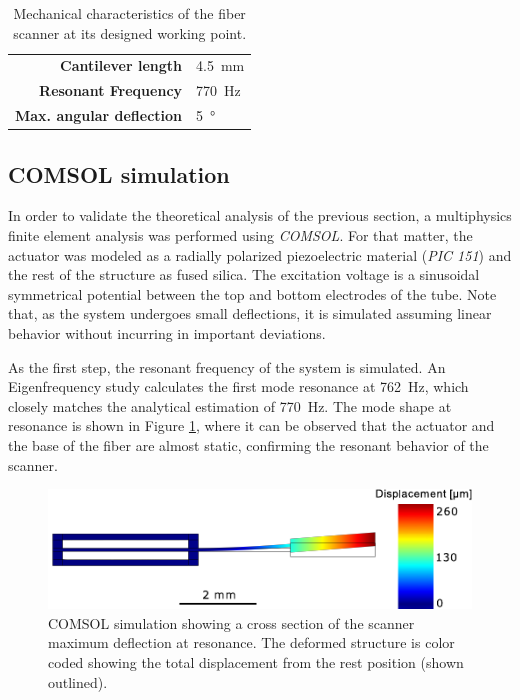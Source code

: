 \begin{table}[h!]\centering
	\caption{Mechanical characteristics of the fiber scanner at its designed working point.}
	\begin{tabular}{rl}\\
		\hline
		\textbf{Cantilever length} & \SI{4.5}{\milli\meter} \\ 
		\textbf{Resonant Frequency} & \SI{770}{\hertz} \\ 
		\textbf{Max. angular deflection} & \SI{5}{\degree} \\ 
		\hline
	\end{tabular} 
    \label{tab:mech}
\end{table}

\subsection{COMSOL simulation}

In order to validate the theoretical analysis of the previous section, a multiphysics finite element analysis was performed using \textit{COMSOL}. For that matter, the actuator was modeled as a radially polarized piezoelectric material (\textit{PIC 151}) and the rest of the structure as fused silica. The excitation voltage is a sinusoidal symmetrical potential between the top and bottom electrodes of the tube. Note that, as the system undergoes small deflections, it is simulated assuming linear behavior \cite{Fertis2006} without incurring in important deviations.

As the first step, the resonant frequency of the system is simulated. An Eigenfrequency study calculates the first mode resonance at \SI{762}{\hertz}, which closely matches the analytical estimation of \SI{770}{\hertz}. The mode shape at resonance is shown in Figure \ref{fig:defle}, where it can be observed that the actuator and the base of the fiber are almost static, confirming the resonant behavior of the scanner.

\begin{figure}[h!]\centering
      \includegraphics[width=10 cm]{figures/30_DesignSimulation/Mechanical/deflection.pdf}
      \caption{COMSOL simulation showing a cross section of the scanner maximum deflection at resonance. The deformed structure is color coded showing the total displacement from the rest position (shown outlined). }
      \label{fig:defle}
\end{figure}

